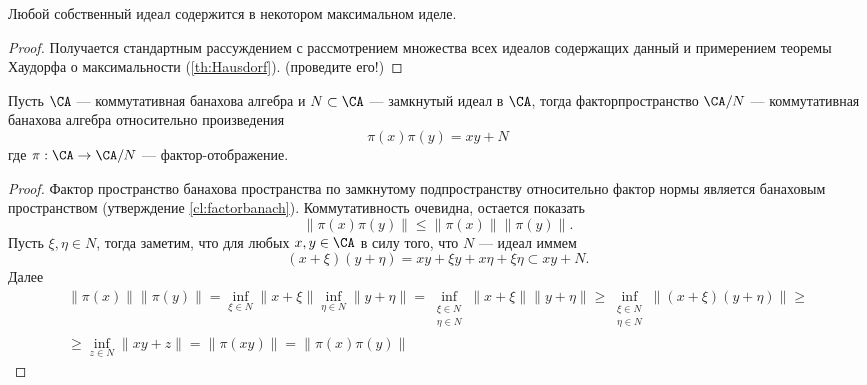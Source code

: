 \begin{lemma}
	Любой собственный идеал содержится в некотором максимальном иделе.
\end{lemma}
\begin{proof}
	Получается стандартным рассуждением с рассмотрением множества всех идеалов содержащих данный и примерением теоремы Хаудорфа о максимальности (\ref{th:Hausdorf}). (проведите его!)
\end{proof}
\begin{lemma}
	Пусть $\CA$ --- коммутативная банахова алгебра и $N \subset \CA$ --- замкнутый идеал в $\CA$, тогда факторпространство $ \CA / N$ --- коммутативная банахова алгебра относительно произведения
	$$
	\pi(x) \pi(y) = xy + N 
	$$
	где $\pi: \CA \to \CA / N$ --- фактор-отображение.
\end{lemma}
\begin{proof}
	Фактор пространство банахова пространства по замкнутому подпространству относительно фактор нормы является банаховым пространством (утверждение \ref{cl:factorbanach}). Коммутативность очевидна, остается показать 
	$$
	\|\pi(x) \pi(y)\| \leq \|\pi(x)\| \|\pi(y)\|.
	$$
	Пусть $\xi, \eta \in N$, тогда заметим, что для любых $x,y \in \CA$ в силу того, что $N$ --- идеал иммем
	$$
	(x  + \xi) (y + \eta) = xy +\xi y +x \eta + \xi \eta \subset xy + N.
	$$
	Далее 
	\begin{align*}
		\|\pi(x)\| \|\pi(y)\| = \inf_{\xi \in N} \|x + \xi\| \inf_{\eta \in N} \|y + \eta\| = \inf\limits_{\substack{\xi \in N\\ \eta \in N }} \|x + \xi\|\|y + \eta\| \geq \inf\limits_{\substack{\xi \in N\\ \eta \in N }} \|(x + \xi)(y + \eta)\|  \geq \\ \geq \inf_{z \in N} \|xy + z\| = \|\pi(xy)\| = \|\pi(x)\pi(y)\|
	\end{align*}
\end{proof}

